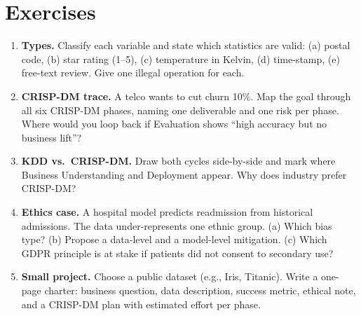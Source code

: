 \section{Exercises}
\begin{enumerate}[label=E1.\arabic*, leftmargin=*, itemsep=0.6em]
    \item \textbf{Types.} Classify each variable and state which statistics are valid: (a) postal code, (b) star rating (1--5), (c) temperature in Kelvin, (d) time-stamp, (e) free-text review. Give one illegal operation for each.
    \item \textbf{CRISP-DM trace.} A telco wants to cut churn 10\%. Map the goal through all six CRISP-DM phases, naming one deliverable and one risk per phase. Where would you loop back if Evaluation shows ``high accuracy but no business lift''?
    \item \textbf{KDD vs.\ CRISP-DM.} Draw both cycles side-by-side and mark where Business Understanding and Deployment appear. Why does industry prefer CRISP-DM?
    \item \textbf{Ethics case.} A hospital model predicts readmission from historical admissions. The data under-represents one ethnic group. (a) Which bias type? (b) Propose a data-level and a model-level mitigation. (c) Which GDPR principle is at stake if patients did not consent to secondary use?
    \item \textbf{Small project.} Choose a public dataset (e.g., Iris, Titanic). Write a one-page charter: business question, data description, success metric, ethical note, and a CRISP-DM plan with estimated effort per phase.
\end{enumerate}
